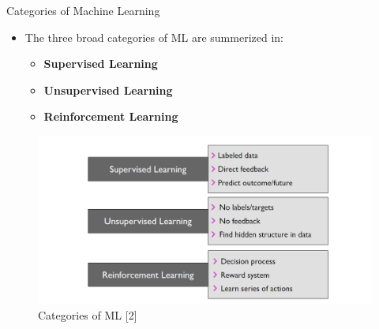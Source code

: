 \documentclass[compress,oilve]{beamer}
\begin{document}



\begin{frame}{Categories of Machine Learning}
\begin{itemize}
\item The three broad categories of ML are summerized in:
\begin{itemize}
\item \textbf{Supervised Learning}
\item \textbf{Unsupervised Learning}  
\item \textbf{Reinforcement Learning} 
\end{itemize}
\end{itemize}
\begin{figure}
\includegraphics[scale=0.5, right]{3}
\caption{Categories of ML [2]}
\end{figure}
\end{frame}
\end{document}
